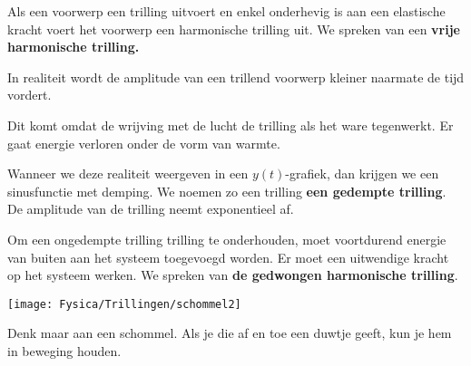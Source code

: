 \documentclass{ximera}
\begin{document}
    \author{Ingmar Herreman}
    \date{Februari 2024}


\def\tick#1#2{\draw[thick] (#1)++(#2:0.12) --++ (#2-180:0.24)}
\def\N{100} %


Als een voorwerp een trilling uitvoert en enkel onderhevig is aan een elastische kracht voert het voorwerp een harmonische trilling uit. We spreken van een \textbf{vrije harmonische trilling.}

In realiteit wordt de amplitude van een trillend voorwerp kleiner naarmate de tijd vordert. 

Dit komt omdat de wrijving met de lucht de trilling als het ware tegenwerkt. Er gaat energie verloren onder de vorm van warmte.
\begin{center}
\end{center}
Wanneer we deze realiteit weergeven in een $y(t)$-grafiek, dan krijgen we een sinusfunctie met demping. We noemen zo een trilling \textbf{een gedempte trilling}. De amplitude van de trilling neemt exponentieel af.

Om een ongedempte trilling trilling te onderhouden, moet voortdurend energie van buiten aan het systeem toegevoegd worden. Er moet een uitwendige kracht op het systeem werken. We spreken van \textbf{de gedwongen harmonische trilling}.
\begin{image}[0.5\textwidth]
    \texttt{[image: Fysica/Trillingen/schommel2]}
\end{image}
Denk maar aan een schommel. Als je die af en toe een duwtje geeft, kun je hem in beweging houden.
\end{document}

